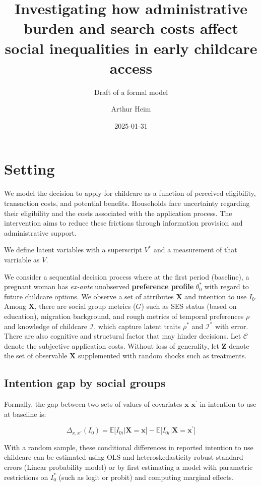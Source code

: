 \documentclass[
]{article}
\title{Investigating how administrative burden and search costs affect social inequalities in early childcare access}
\subtitle{Draft of a formal model}
\author{Arthur Heim}
\date{2025-01-31}
\newcommand{\espb}[1]{\mathds{E}\Big[ #1 \Big]}
\theoremstyle{definition}
\theoremstyle{definition}
\theoremstyle{definition}
\theoremstyle{definition}
\theoremstyle{remark}
\begin{document}
\maketitle

\section{Setting}\label{setting}

We model the decision to apply for childcare as a function of perceived eligibility, transaction costs, and potential benefits. Households face uncertainty regarding their eligibility and the costs associated with the application process. The intervention aims to reduce these frictions through information provision and administrative support.

We define latent variables with a superscript \(V^*\) and a measurement of that varriable as \(V\).

We consider a sequential decision process where at the first period (baseline),
a pregnant woman has \emph{ex-ante} unobserved \textbf{preference profile} \(\theta^*_0\) with regard to future childcare options. We observe a set of attributes \(\mathbf{X}\) and intention to use \(I_0\). Among \(\mathbf{X}\), there are social group metrics (\(G\)) such as SES status (based on education), migration background, and rough metrics of temporal preferences \(\rho\) and knowledge of childcare \(\mathcal{I}\), which capture latent traits \(\rho^*\) and \(\mathcal{I}^*\) with error. There are also cognitive and structural factor that may hinder decisions. Let \(\mathcal{C}\) denote the subjective application costs.
Without loss of generality, let \(\mathbf{Z}\) denote the set of observable \(\mathbf{X}\) supplemented with random shocks such as treatments.

\subsection{Intention gap by social groups}\label{intention-gap-by-social-groups}

Formally, the gap between two sets of values of covariates \(\mathbf{x}\) \(\mathbf{x^\prime}\) in intention to use at baseline is:

\begin{equation}
\Delta_{x,x'}(I_{0}) = \espb{I_{0i}|\mathbf{X}=\mathbf{x}}-\espb{I_{0i}|\mathbf{X}=\mathbf{x^\prime}}
\end{equation}

With a random sample, these conditional differences in reported intention to use childcare can be estimated using OLS and heteroskedasticity robust standard errors (Linear probability model) or by first estimating a model with parametric restrictions on \(I_0^*\) (such as logit or probit) and computing marginal effects.
\end{document}
